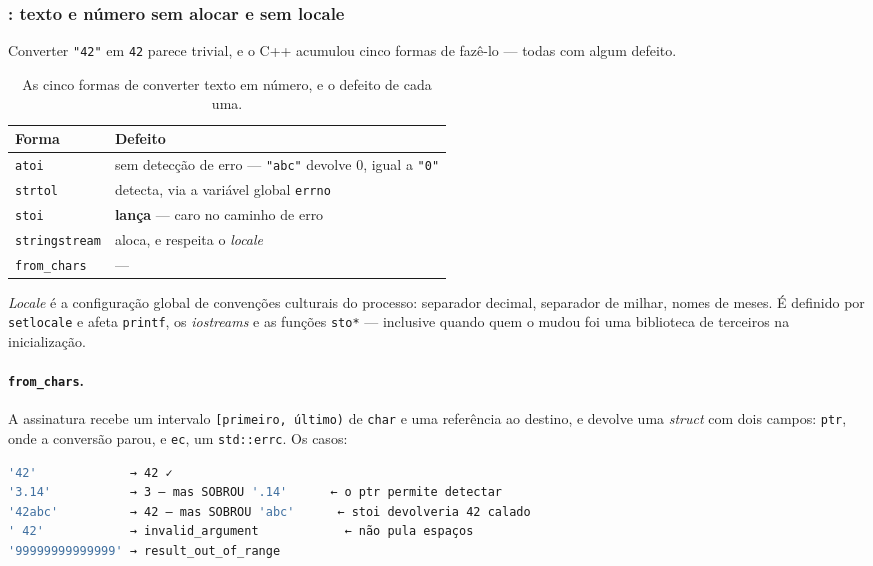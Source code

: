 \subsubsection{: texto e número sem alocar e sem locale}
\label{sec:charconv}

Converter \texttt{"42"} em \texttt{42} parece trivial, e o C++ acumulou cinco
formas de fazê-lo --- todas com algum defeito.

\begin{table}[htbp]
\centering
\caption{As cinco formas de converter texto em número, e o defeito de cada uma.}
\label{tab:texto-numero}
\footnotesize
\begin{tabular}{@{}ll@{}}
\toprule
\textbf{Forma} & \textbf{Defeito} \\
\midrule
\texttt{atoi}         & sem detecção de erro --- \texttt{"abc"} devolve 0, igual a \texttt{"0"} \\
\texttt{strtol}       & detecta, via a variável global \texttt{errno} \\
\texttt{stoi}         & \textbf{lança} --- caro no caminho de erro \\
\texttt{stringstream} & aloca, e respeita o \emph{locale} \\
\texttt{from\_chars}  & --- \\
\bottomrule
\end{tabular}
\end{table}

\emph{Locale} é a configuração global de convenções culturais do processo:
separador decimal, separador de milhar, nomes de meses. É definido por
\texttt{setlocale} e afeta \texttt{printf}, os \emph{iostreams} e as funções
\texttt{sto*} --- inclusive quando quem o mudou foi uma biblioteca de terceiros
na inicialização.

\paragraph{\texttt{from\_chars}.} A assinatura recebe um intervalo
\texttt{[primeiro, último)} de \texttt{char} e uma referência ao destino, e
devolve uma \emph{struct} com dois campos: \texttt{ptr}, onde a conversão parou,
e \texttt{ec}, um \texttt{std::errc}. Os casos:

\begin{lstlisting}[style=bt, language=bash,
    caption={Saída de \texttt{src/strings/}: \texttt{from\_chars} sobre entradas
             típicas.}]
'42'             → 42 ✓
'3.14'           → 3 — mas SOBROU '.14'      ← o ptr permite detectar
'42abc'          → 42 — mas SOBROU 'abc'      ← stoi devolveria 42 calado
' 42'            → invalid_argument            ← não pula espaços
'99999999999999' → result_out_of_range
\end{lstlisting}

